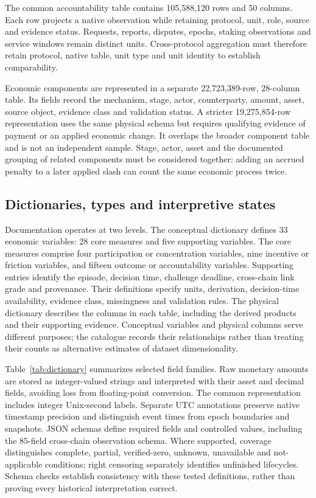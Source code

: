 The common accountability table contains 105,588,120 rows and 50 columns. Each row projects a native observation while retaining protocol, unit, role, source and evidence status. Requests, reports, disputes, epochs, staking observations and service windows remain distinct units. Cross-protocol aggregation must therefore retain protocol, native table, unit type and unit identity to establish comparability.

Economic components are represented in a separate 22,723,389-row, 28-column table. Its fields record the mechanism, stage, actor, counterparty, amount, asset, source object, evidence class and validation status. A stricter 19,275,854-row representation uses the same physical schema but requires qualifying evidence of payment or an applied economic change. It overlaps the broader component table and is not an independent sample. Stage, actor, asset and the documented grouping of related components must be considered together: adding an accrued penalty to a later applied slash can count the same economic process twice.

\subsection{Dictionaries, types and interpretive states}

Documentation operates at two levels. The conceptual dictionary defines 33 economic variables: 28 core measures and five supporting variables. The core measures comprise four participation or concentration variables, nine incentive or friction variables, and fifteen outcome or accountability variables. Supporting entries identify the episode, decision time, challenge deadline, cross-chain link grade and provenance. Their definitions specify units, derivation, decision-time availability, evidence class, missingness and validation rules. The physical dictionary describes the columns in each table, including the derived products and their supporting evidence. Conceptual variables and physical columns serve different purposes; the catalogue records their relationships rather than treating their counts as alternative estimates of dataset dimensionality.

Table~\ref{tab:dictionary} summarizes selected field families. Raw monetary amounts are stored as integer-valued strings and interpreted with their asset and decimal fields, avoiding loss from floating-point conversion. The common representation includes integer Unix-second labels. Separate UTC annotations preserve native timestamp precision and distinguish event times from epoch boundaries and snapshots. JSON schemas define required fields and controlled values, including the 85-field cross-chain observation schema. Where supported, coverage distinguishes complete, partial, verified-zero, unknown, unavailable and not-applicable conditions; right censoring separately identifies unfinished lifecycles. Schema checks establish consistency with these tested definitions, rather than proving every historical interpretation correct.

